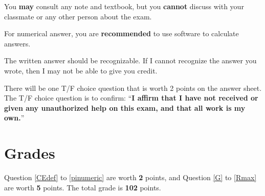 \documentclass[14pt]{extarticle}
\begin{document}
You \textbf{may} consult any note and textbook, but you \textbf{cannot} discuss with your classmate or any other person about the exam.

For numerical answer, you are \textbf{recommended} to use software to calculate answers.

The written answer should be recognizable.
If I cannot recognize the answer you wrote, then I may not be able to give you credit.

There will be one T/F choice question that is worth 2 points on the answer sheet. The T/F choice question is to confirm: ``\textbf{I affirm that I have not received or given any unauthorized help on this exam, and that all work is my own.}''

\section*{Grades}
\label{sec:Grades}

Question \ref{CEdef} to \ref{pinumeric} are worth \textbf{2} points, and Question \ref{G} to \ref{Rmax} are worth \textbf{5} points.
The total grade is \textbf{102} points.


\newpage
\end{document}
